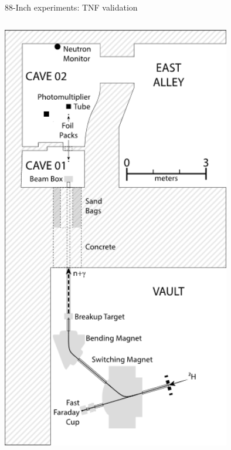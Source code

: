 \documentclass[xcolor=x11names,compress,handout]{beamer}
\renewcommand{\(}{\begin{columns}}
\renewcommand{\)}{\end{columns}}
\newcommand{\<}[1]{\begin{column}{#1}}
\renewcommand{\>}{\end{column}}
\begin{document}
\begin{frame}{88-Inch experiments: TNF validation}
\begin{columns}
        \begin{column}{0.45\linewidth}
          \includegraphics[width=0.75\textwidth]{../figs/88InchLayout.png}
        \end{column}
      \end{columns}
\end{frame}
\end{document}
